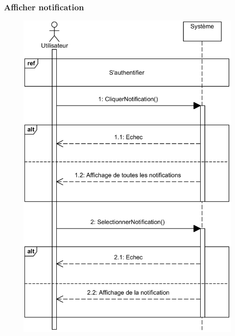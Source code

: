     \subsubsection[Afficher notification]{Afficher notification}
        \begin{figure}[H]
            \centering
            \includegraphics[width=130mm]{images/sd-notification.png}
            \label{fig:sdAffNotification}
        \end{figure}
\pagebreak
